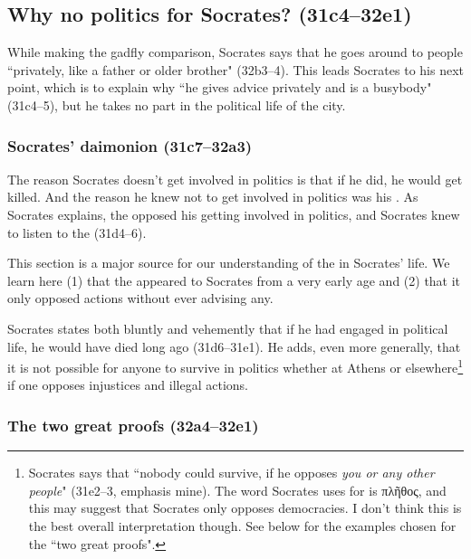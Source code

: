 \documentclass[11pt]{article}
\begin{document}
\subsection{Why no politics for Socrates? (31c4--32e1)}

While making the gadfly comparison, Socrates says that he goes around to people ``privately, like a father or older brother" (32b3--4).  This leads Socrates to his next point, which is to explain why ``he gives advice privately and is a busybody" (31c4--5), but he takes no part in the political life of the city.

\subsubsection{Socrates' daimonion (31c7--32a3)}

The reason Socrates doesn't get involved in politics is that if he did, he would get killed.  And the reason he knew not to get involved in politics was his .  As Socrates explains, the  opposed his getting involved in politics, and Socrates knew to listen to the  (31d4--6).

This section is a major source for our understanding of the  in Socrates' life.  We learn here (1) that the  appeared to Socrates from a very early age and (2) that it only opposed actions without ever advising any.

Socrates states both bluntly and vehemently that if he had engaged in political life, he would have died long ago (31d6--31e1).  He adds, even more generally, that it is not possible for anyone to survive in politics whether at Athens or elsewhere\footnote{Socrates says that ``nobody could survive, if he opposes \emph{you or any other people}" (31e2--3, emphasis mine).  The word Socrates uses for  is πλῆθος, and this may suggest that Socrates only opposes democracies.  I don't think this is the best overall interpretation though.  See below for the examples chosen for the ``two great proofs".} if one opposes injustices and illegal actions.

\subsubsection{The two great proofs (32a4--32e1)}
\end{document}
